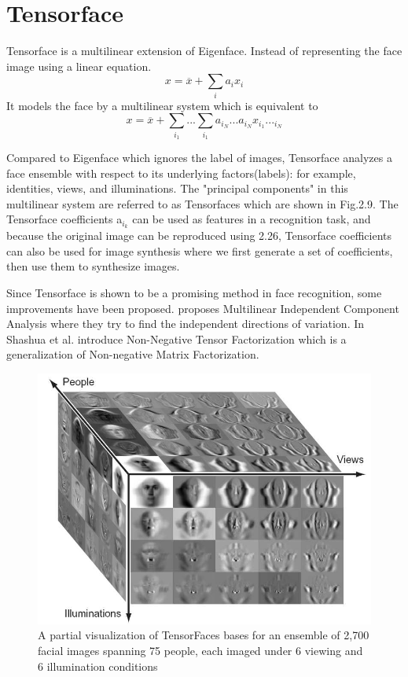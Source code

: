 \documentclass[12pt]{report}
\begin{document}
\section {Tensorface}
Tensorface \cite{90} is a multilinear extension of Eigenface. Instead of representing the face image using a linear equation.
\begin{equation}
x=\overline{x}+\sum_{i}a_i x_i
\end{equation}
It models the face by a multilinear system which is equivalent to
\begin{equation}
x=\overline{x}+\sum_{i_1}...\sum_{i_1}a_{i_N}...a_{i_N} x_{i_1}..._{i_N}
\end{equation}
\par 
Compared to Eigenface which ignores the label of images, Tensorface analyzes a face ensemble with respect to its underlying factors(labels): for example, identities, views, and illuminations. The "principal components" in this multilinear system are referred to as Tensorfaces which are shown in Fig.2.9. The Tensorface coefficients a$_{i_k}$ can be used as features in a recognition task, and because the original image can be reproduced using 2.26, Tensorface coefficients can also be used for image synthesis where we first generate a set of coefficients, then use them to synthesize images.

\par
Since Tensorface is shown to be a promising method in face recognition, some improvements have been proposed. \cite{92} proposes Multilinear Independent Component Analysis where they try to find the independent directions of variation. In \cite{76} Shashua et al. introduce Non-Negative Tensor Factorization which is a generalization of Non-negative Matrix Factorization.
\par 
\begin{figure}
\includegraphics[width=\textwidth]{img/tensorface.png}
\caption{A partial visualization of TensorFaces bases for an ensemble of 2,700 facial images spanning 75 people, each imaged under 6 viewing and 6 illumination conditions \cite{92}}
\label{Fig 2.9}
\end{figure}
\end{document}
